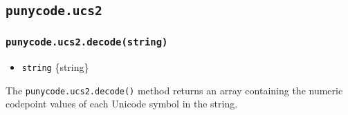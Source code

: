 \begin{Shaded}
\begin{Highlighting}[]
\NormalTok{(}\NormalTok{)}\OperatorTok{;} 
\NormalTok{(}\NormalTok{)}\OperatorTok{;}  
\NormalTok{(}\NormalTok{)}\OperatorTok{;}       
\end{Highlighting}
\end{Shaded}

\subsection{\texorpdfstring{\texttt{punycode.ucs2}}{punycode.ucs2}}\label{punycode.ucs2}

\subsubsection{\texorpdfstring{\texttt{punycode.ucs2.decode(string)}}{punycode.ucs2.decode(string)}}\label{punycode.ucs2.decodestring}

\begin{itemize}
\tightlist
\item
  \texttt{string} \{string\}
\end{itemize}

The \texttt{punycode.ucs2.decode()} method returns an array containing
the numeric codepoint values of each Unicode symbol in the string.

\begin{Shaded}
\begin{Highlighting}[]
\NormalTok{(}\NormalTok{)}\OperatorTok{;} \CommentTok{// [0x61, 0x62, 0x63]}
\NormalTok{(}\StringTok{\textquotesingle{}}\StringTok{\textquotesingle{}}\NormalTok{)}\OperatorTok{;} \CommentTok{// [0x1D306]}
\end{Highlighting}
\end{Shaded}

